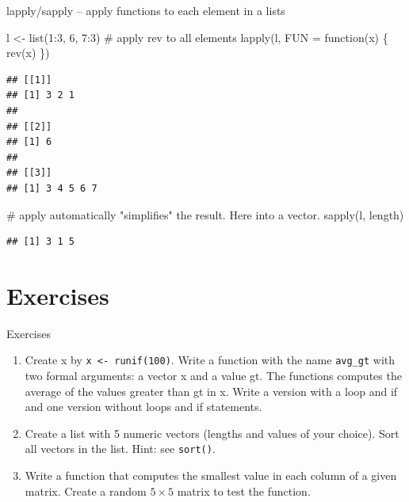 \documentclass[
  9pt,
  ignorenonframetext,
]{beamer}
\newenvironment{Shaded}{\begin{snugshade}}{\end{snugshade}}
\newcommand{\CommentTok}[1]{\textcolor[rgb]{0.50,0.62,0.50}{#1}}
\newcommand{\ControlFlowTok}[1]{\textcolor[rgb]{0.94,0.87,0.69}{#1}}
\newcommand{\DataTypeTok}[1]{\textcolor[rgb]{0.87,0.87,0.75}{#1}}
\newcommand{\DecValTok}[1]{\textcolor[rgb]{0.86,0.86,0.80}{#1}}
\newcommand{\KeywordTok}[1]{\textcolor[rgb]{0.94,0.87,0.69}{#1}}
\newcommand{\NormalTok}[1]{\textcolor[rgb]{0.80,0.80,0.80}{#1}}
\newcommand{\OperatorTok}[1]{\textcolor[rgb]{0.94,0.94,0.82}{#1}}
\newcommand{\StringTok}[1]{\textcolor[rgb]{0.80,0.58,0.58}{#1}}
\begin{document}
\begin{frame}[fragile]{lapply/sapply -- apply functions to each element
in a lists}
\protect\hypertarget{lapplysapply-apply-functions-to-each-element-in-a-lists}{}
\begin{Shaded}
\begin{Highlighting}[]
\NormalTok{l \textless{}{-}}\StringTok{ }\KeywordTok{list}\NormalTok{(}\DecValTok{1}\OperatorTok{:}\DecValTok{3}\NormalTok{, }\DecValTok{6}\NormalTok{, }\DecValTok{7}\OperatorTok{:}\DecValTok{3}\NormalTok{)}
\CommentTok{\# apply rev to all elements}
\KeywordTok{lapply}\NormalTok{(l, }\DataTypeTok{FUN =} \ControlFlowTok{function}\NormalTok{(x) \{ }\KeywordTok{rev}\NormalTok{(x) \}) }
\end{Highlighting}
\end{Shaded}

\begin{verbatim}
## [[1]]
## [1] 3 2 1
## 
## [[2]]
## [1] 6
## 
## [[3]]
## [1] 3 4 5 6 7
\end{verbatim}

\begin{Shaded}
\begin{Highlighting}[]
\CommentTok{\# apply automatically "simplifies" the result. Here into a vector.}
\KeywordTok{sapply}\NormalTok{(l, length)             }
\end{Highlighting}
\end{Shaded}

\begin{verbatim}
## [1] 3 1 5
\end{verbatim}
\end{frame}

\hypertarget{exercises}{%
\section{Exercises}\label{exercises}}

\begin{frame}[fragile]{Exercises}
\protect\hypertarget{exercises-1}{}
\begin{enumerate}
\item
  Create x by \texttt{x\ \textless{}-\ runif(100)}. Write a function
  with the name \texttt{avg\_gt} with two formal arguments: a vector x
  and a value gt. The functions computes the average of the values
  greater than gt in x. Write a version with a loop and if and one
  version without loops and if statements.
\item
  Create a list with 5 numeric vectors (lengths and values of your
  choice). Sort all vectors in the list. Hint: see \texttt{sort()}.
\item
  Write a function that computes the smallest value in each column of a
  given matrix. Create a random \(5\times5\) matrix to test the
  function.
\end{enumerate}
\end{frame}
\end{document}
